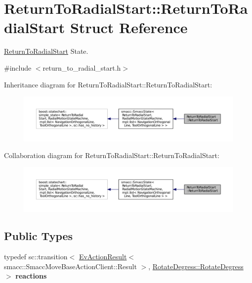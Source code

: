 \hypertarget{structReturnToRadialStart_1_1ReturnToRadialStart}{}\section{Return\+To\+Radial\+Start\+:\+:Return\+To\+Radial\+Start Struct Reference}
\label{structReturnToRadialStart_1_1ReturnToRadialStart}


\hyperlink{structReturnToRadialStart_1_1ReturnToRadialStart}{Return\+To\+Radial\+Start} State.  




{\ttfamily \#include $<$return\+\_\+to\+\_\+radial\+\_\+start.\+h$>$}



Inheritance diagram for Return\+To\+Radial\+Start\+:\+:Return\+To\+Radial\+Start\+:
\nopagebreak
\begin{figure}[H]
\begin{center}
\leavevmode
\includegraphics[width=350pt]{structReturnToRadialStart_1_1ReturnToRadialStart__inherit__graph}
\end{center}
\end{figure}


Collaboration diagram for Return\+To\+Radial\+Start\+:\+:Return\+To\+Radial\+Start\+:
\nopagebreak
\begin{figure}[H]
\begin{center}
\leavevmode
\includegraphics[width=350pt]{structReturnToRadialStart_1_1ReturnToRadialStart__coll__graph}
\end{center}
\end{figure}
\subsection*{Public Types}
\begin{DoxyCompactItemize}
\item 
typedef sc\+::transition$<$ \hyperlink{structsmacc_1_1EvActionResult}{Ev\+Action\+Result}$<$ smacc\+::\+Smacc\+Move\+Base\+Action\+Client\+::\+Result $>$, \hyperlink{structRotateDegress_1_1RotateDegress}{Rotate\+Degress\+::\+Rotate\+Degress} $>$ {\bfseries reactions}\hypertarget{structReturnToRadialStart_1_1ReturnToRadialStart_a74a509e54d1b8eefbaa1ff19ba6f5b57}{}\label{structReturnToRadialStart_1_1ReturnToRadialStart_a74a509e54d1b8eefbaa1ff19ba6f5b57}

\end{DoxyCompactItemize}
